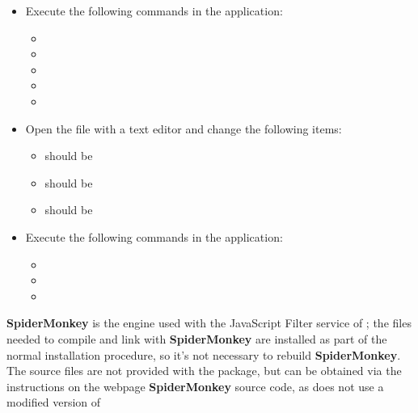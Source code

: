 \tertiaryEnd
{}
\begin{itemize}
\item Execute the following commands in the  application:
\begin{itemize}
\item {}
\item\exSp{}
\item\exSp{}
\item\exSp{}
\item\exSp{}
\end{itemize}
\item\exSp{}Open the file  with a text editor and change the
following items:
\begin{itemize}
\item {} should be 
\item\exSp{} should be 
\item\exSp{} should be 
\end{itemize}
\item\exSp{}Execute the following commands in the  application:
\begin{itemize}
\item {}
\item\exSp{}
\item\exSp{}
\end{itemize}
\end{itemize}
\tertiaryEnd
\secondaryEnd
\newcommand{\spiderversion}{48a1}%
\textbf{SpiderMonkey} is the  engine used with the JavaScript Filter
service of \mplusm{}; the files needed to compile and link with \textbf{SpiderMonkey} are
installed as part of the normal \mplusm{} installation procedure, so it's not necessary to
rebuild \textbf{SpiderMonkey}.
The source files are not provided with the  package, but can be obtained
via the instructions on the web\longDash{}page
%
{\textbf{SpiderMonkey} source code}, as \mplusm{} does not use a modified version of
